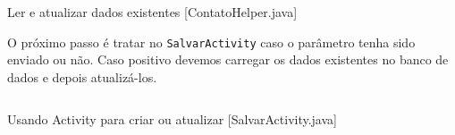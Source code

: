 \begin{listing}[H]
  \inputminted[linenos=true,frame=bottomline,tabsize=3]{ java }{ source/ContatoHelper-4.java }
  \caption{Ler e atualizar dados existentes [ContatoHelper.java]}
\end{listing}

O próximo passo é tratar no \texttt{SalvarActivity} caso o parâmetro tenha sido enviado ou não. Caso positivo
devemos carregar os dados existentes no banco de dados e depois atualizá-los.

\begin{listing}[H]
  \inputminted[linenos=true,frame=bottomline,tabsize=3]{ java }{ source/SalvarActivity-3.java }
  \caption{Usando Activity para criar ou atualizar [SalvarActivity.java]}
\end{listing}
